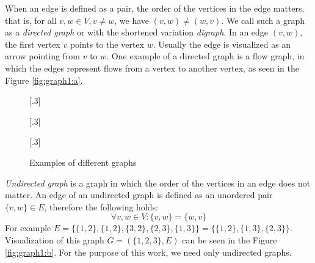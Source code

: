 When an edge is defined as a pair, the order of the vertices in the edge matters, that is, for all $v, w \in V, v \neq w$, we have  $(v, w) \neq (w, v)$.
We call such a graph as a \emph{directed graph} or with the shortened variation \emph{digraph}.
In an edge $(v, w)$, the first vertex $v$ points to the vertex $w$.
Usually the edge is visualized as an arrow pointing from $v$ to $w$.
One example of a directed graph is a flow graph, in which the edges represent flows from a vertex to another vertex, as seen in the Figure \ref{fig:graph1:a}.

\begin{figure}[H]
    [.3\linewidth] {
    \centering
  }
  \hfill
    [.3\linewidth] {
    \centering
  }
  \hfill
    [.3\linewidth] {
    \centering
  }
  \caption{Examples of different graphs}
  \label{fig:graph1}
\end{figure}

\emph{Undirected graph} is a graph in which the order of the vertices in an edge does not matter.
An edge of an undirected graph is defined as an unordered pair $\{v, w\} \in E$, therefore the following holds:
\begin{equation}
\forall v, w \in V\colon \{v, w\} = \{w, v\}
\end{equation}
For example $E=\{\{1, 2\}, \{1, 2\}, \{3, 2\}, \{2, 3\}, \{1, 3\}\}=\{\{1,2\},\{1,3\},\{2,3\}\}$.
Visualization of this graph $G=(\{1,2,3\}, E)$ can be seen in the Figure \ref{fig:graph1:b}.
For the purpose of this work, we need only undirected graphs.

